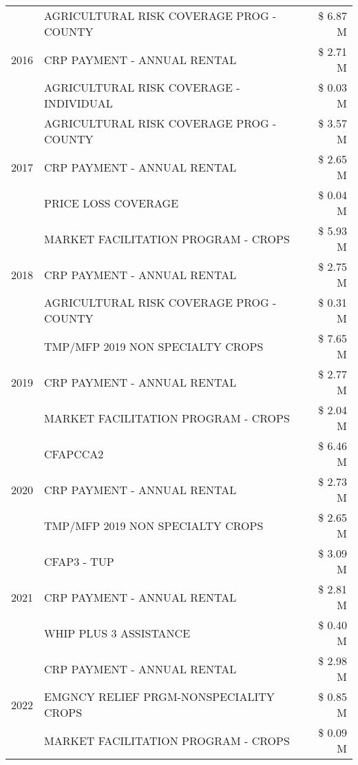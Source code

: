 \begin{tabular}{llr}
\cline{1-3}
\multirow[t]{3}{*}{2016} & AGRICULTURAL RISK COVERAGE PROG - COUNTY & \$ 6.87 M \\
 & CRP PAYMENT - ANNUAL RENTAL & \$ 2.71 M \\
 & AGRICULTURAL RISK COVERAGE - INDIVIDUAL & \$ 0.03 M \\
\cline{1-3}
\multirow[t]{3}{*}{2017} & AGRICULTURAL RISK COVERAGE PROG - COUNTY & \$ 3.57 M \\
 & CRP PAYMENT - ANNUAL RENTAL & \$ 2.65 M \\
 & PRICE LOSS COVERAGE & \$ 0.04 M \\
\cline{1-3}
\multirow[t]{3}{*}{2018} & MARKET FACILITATION PROGRAM - CROPS & \$ 5.93 M \\
 & CRP PAYMENT - ANNUAL RENTAL & \$ 2.75 M \\
 & AGRICULTURAL RISK COVERAGE PROG - COUNTY & \$ 0.31 M \\
\cline{1-3}
\multirow[t]{3}{*}{2019} & TMP/MFP 2019 NON SPECIALTY CROPS & \$ 7.65 M \\
 & CRP PAYMENT - ANNUAL RENTAL & \$ 2.77 M \\
 & MARKET FACILITATION PROGRAM - CROPS & \$ 2.04 M \\
\cline{1-3}
\multirow[t]{3}{*}{2020} & CFAPCCA2 & \$ 6.46 M \\
 & CRP PAYMENT - ANNUAL RENTAL & \$ 2.73 M \\
 & TMP/MFP 2019 NON SPECIALTY CROPS & \$ 2.65 M \\
\cline{1-3}
\multirow[t]{3}{*}{2021} & CFAP3 - TUP & \$ 3.09 M \\
 & CRP PAYMENT - ANNUAL RENTAL & \$ 2.81 M \\
 & WHIP PLUS 3 ASSISTANCE & \$ 0.40 M \\
\cline{1-3}
\multirow[t]{3}{*}{2022} & CRP PAYMENT - ANNUAL RENTAL & \$ 2.98 M \\
 & EMGNCY RELIEF PRGM-NONSPECIALITY CROPS & \$ 0.85 M \\
 & MARKET FACILITATION PROGRAM - CROPS & \$ 0.09 M \\
\cline{1-3}
\bottomrule
\end{tabular}
